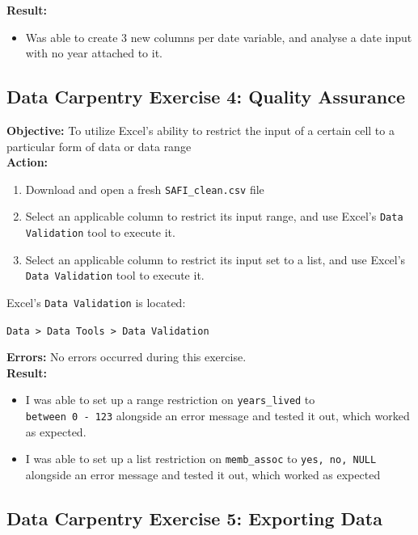 \documentclass{article}
\begin{document}
\textbf{Result:}
\begin{itemize}
    \item Was able to create 3 new columns per date variable, and analyse a date input with no year attached to it.
\end{itemize}
\newpage
\begin{center}
\section{Data Carpentry Exercise 4: Quality Assurance}
\end{center}
\textbf{Objective:} To utilize Excel's ability to restrict the input of a certain cell to a particular form of data or data range \\
\textbf{Action:}
\begin{enumerate}
    \item Download and open a fresh \verb|SAFI_clean.csv| file
    \item Select an applicable column to restrict its input range, and use Excel's \verb|Data Validation| tool to execute it.
    \item Select an applicable column to restrict its input set to a list, and use Excel's \verb|Data Validation| tool to execute it.
\end{enumerate}
Excel's \verb|Data Validation| is located: \begin{center}
\verb|Data > Data Tools > Data Validation|
\end{center}
\textbf{Errors:}
No errors occurred during this exercise.\\
\textbf{Result:}
\begin{itemize}
    \item I was able to set up a range restriction on \verb|years_lived| to \\\verb|between 0 - 123| alongside an error message and tested it out, which worked as expected.
    \item I was able to set up a list restriction on \verb|memb_assoc| to \verb|yes, no, NULL| alongside an error message and tested it out, which worked as expected
\end{itemize}
\newpage
\begin{center}
\section{Data Carpentry Exercise 5: Exporting Data}
\end{center}
\end{document}
